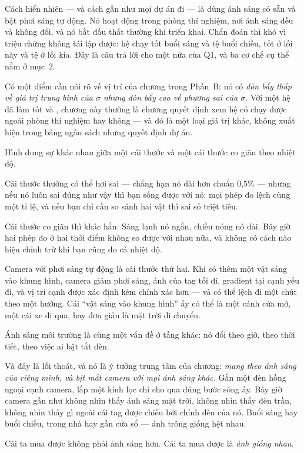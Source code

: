 \documentclass[../../marker.tex]{subfiles}
\begin{document}
Cách hiển nhiên --- và cách gần như mọi dự án đi --- là dùng ánh sáng có sẵn và bật phơi sáng tự động. Nó hoạt động trong phòng thí nghiệm, nơi ánh sáng đều và không đổi, và nó bắt đầu thất thường khi triển khai. Chẩn đoán thì khó vì triệu chứng không tái lập được: hệ chạy tốt buổi sáng và tệ buổi chiều, tốt ở lối này và tệ ở lối kia. Đây là câu trả lời cho một nửa của Q1, và ba cơ chế cụ thể nằm ở mục~2.

Có một điểm cần nói rõ về vị trí của chương trong Phần~B: nó có \emph{đòn bẩy thấp về giá trị trung bình của \(\sigma\) nhưng đòn bẩy cao về phương sai của \(\sigma\)}. Với một hệ đã làm tốt  và , chương này thường là chương quyết định xem hệ có chạy được ngoài phòng thí nghiệm hay không --- và đó là một loại giá trị khác, không xuất hiện trong bảng ngân sách nhưng quyết định dự án.

\begin{trucgiac}
Hình dung sự khác nhau giữa một cái thước và một cái thước co giãn theo nhiệt độ.

Cái thước thường có thể hơi sai --- chẳng hạn nó dài hơn chuẩn 0,5\% --- nhưng nếu nó luôn sai đúng như vậy thì bạn sống được với nó: mọi phép đo lệch cùng một tỉ lệ, và nếu bạn chỉ cần so sánh hai vật thì sai số triệt tiêu.

Cái thước co giãn thì khác hẳn. Sáng lạnh nó ngắn, chiều nóng nó dài. Bây giờ hai phép đo ở hai thời điểm không so được với nhau nữa, và không có cách nào hiệu chỉnh trừ khi bạn cũng đo cả nhiệt độ.

Camera với phơi sáng tự động là cái thước thứ hai. Khi có thêm một vật sáng vào khung hình, camera giảm phơi sáng, ảnh của tag tối đi, gradient tại cạnh yếu đi, và vị trí cạnh được xác định kém chính xác hơn --- và có thể lệch đi một chút theo một hướng. Cái ``vật sáng vào khung hình'' ấy có thể là một cánh cửa mở, một cái xe đi qua, hay đơn giản là mặt trời di chuyển.

Ánh sáng môi trường là cùng một vấn đề ở tầng khác: nó đổi theo giờ, theo thời tiết, theo việc ai bật tắt đèn.

Và đây là lối thoát, và nó là ý tưởng trung tâm của chương: \emph{mang theo ánh sáng của riêng mình, và bịt mắt camera với mọi ánh sáng khác}. Gắn một đèn hồng ngoại cạnh camera, lắp một kính lọc chỉ cho qua đúng bước sóng ấy. Bây giờ camera gần như không nhìn thấy ánh sáng mặt trời, không nhìn thấy đèn trần, không nhìn thấy gì ngoài cái tag được chiếu bởi chính đèn của nó. Buổi sáng hay buổi chiều, trong nhà hay gần cửa sổ --- ảnh trông giống hệt nhau.

Cái ta mua được không phải ảnh sáng hơn. Cái ta mua được là \emph{ảnh giống nhau}.
\end{trucgiac}
\end{document}
